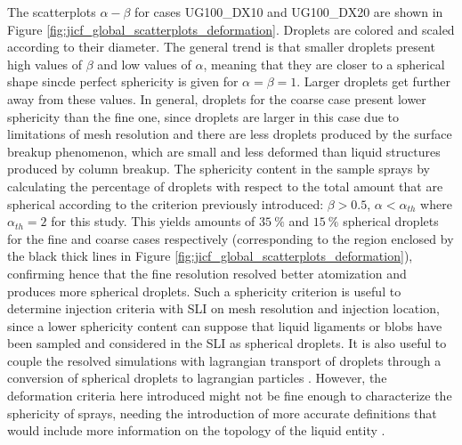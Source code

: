 The scatterplots $\alpha - \beta$ for cases UG100\_DX10 and UG100\_DX20 are shown in Figure \ref{fig:jicf_global_scatterplots_deformation}. Droplets are colored and scaled according to their diameter. The general trend is that smaller droplets present high values of $\beta$ and low values of $\alpha$, meaning that they are closer to a spherical shape sincde perfect sphericity is given for $\alpha = \beta= 1$. Larger droplets get further away from these values. In general, droplets for the coarse case present lower sphericity than the fine one, since droplets are larger in this case due to limitations of mesh resolution and there are less droplets produced by the surface breakup phenomenon, which are small and less deformed than liquid structures produced by column breakup. The sphericity content in the sample sprays by calculating the percentage of droplets with respect to the total amount that are spherical according to the criterion previously introduced: $\beta > 0.5$, $\alpha < \alpha_{th}$ where $\alpha_{th} = 2$ for this study. This yields amounts of $35~\%$ and $15~\%$ spherical droplets for the fine and coarse cases respectively (corresponding to the region enclosed by the black thick lines in Figure \ref{fig:jicf_global_scatterplots_deformation}), confirming hence that the fine resolution resolved better atomization and produces more spherical droplets. Such a sphericity criterion is useful to determine injection criteria with SLI on mesh resolution and injection location, since a lower sphericity content can suppose that liquid ligaments or blobs have been sampled and considered in the SLI as spherical droplets. It is also useful to couple the resolved simulations with lagrangian transport of droplets through a conversion of spherical droplets to lagrangian particles . However, the deformation criteria here introduced might not be fine enough to characterize the sphericity of sprays, needing the introduction of more accurate definitions that would include more information on the topology of the liquid entity . 


